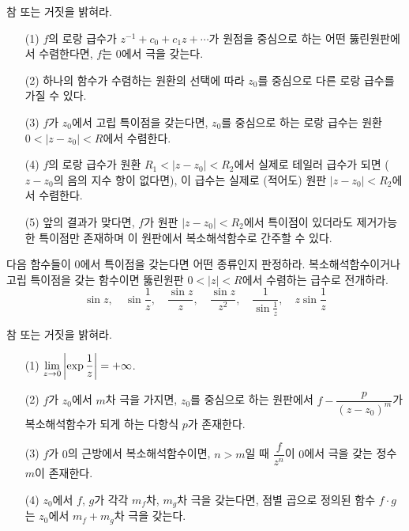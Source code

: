 \begin{salt_exercise}\label{ex-4-33}
참 또는 거짓을 밝혀라.
\begin{itemize}
\item[(1)] $f$의 로랑 급수가 $z^{-1} + c_0 + c_1z + \cdots$가
원점을 중심으로 하는 어떤 뚫린원판에서 수렴한다면, $f$는 $0$에서 극을 갖는다.
\item[(2)] 하나의 함수가 수렴하는 원환의 선택에 따라 $z_0$를 중심으로 다른
로랑 급수를 가질 수 있다.
\item[(3)] $f$가 $z_0$에서 고립 특이점을 갖는다면, 
$z_0$를 중심으로 하는 로랑 급수는 원환 $0<|z-z_0|<R$에서 수렴한다.
\item[(4)] $f$의 로랑 급수가 원환 $R_1 <|z-z_0| <R_2$에서
실제로 테일러 급수가 되면 ($z-z_0$의 음의 지수 항이 없다면),
이 급수는 실제로 (적어도) 원판 $|z-z_0|<R_2$에서 수렴한다.
\item[(5)] 앞의 결과가 맞다면, $f$가 원판 $|z-z_0|<R_2$에서
특이점이 있더라도 제거가능한 특이점만 존재하며 
이 원판에서 복소해석함수로 간주할 수 있다.
\end{itemize}
\end{salt_exercise}

\begin{salt_exercise}\label{ex-4-34}
다음 함수들이 $0$에서 특이점을 갖는다면 어떤 종류인지 판정하라.
복소해석함수이거나 고립 특이점을 갖는 함수이면
뚫린원판 $0<|z|<R$에서 수렴하는 급수로 전개하라.
\[
\sin z, \quad \sin \dfrac1z,\quad \dfrac{\sin z}z,
\quad \dfrac{\sin z}{z^2}, \quad \dfrac1{\sin \frac1z},
\quad z\sin \dfrac1z
\]
\end{salt_exercise}

\begin{salt_exercise}\label{ex-4-35}
참 또는 거짓을 밝혀라.
\begin{itemize}
\item[(1)] $\lim\limits_{z\to 0} \left| \exp \displaystyle\frac1z \right| = +\infty$.
\item[(2)] $f$가 $z_0$에서 $m$차 극을 가지면, 
$z_0$를 중심으로 하는 원판에서
$f - \dfrac{p}{(z-z_0)^m}$가 복소해석함수가 되게 하는
다항식 $p$가 존재한다.
\item[(3)] $f$가 $0$의 근방에서 복소해석함수이면,
$n>m$일 때 $\dfrac f{z^n}$이 $0$에서 극을 갖는 정수 $m$이 존재한다.
\item[(4)] $z_0$에서 $f$, $g$가 각각 $m_f$차, $m_g$차 극을 갖는다면,
점별 곱으로 정의된 함수 $f\cdot g$는 $z_0$에서 $m_f+m_g$차 극을 갖는다.
\end{itemize}
\end{salt_exercise}

